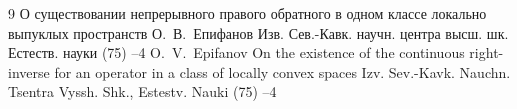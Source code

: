 \begin{thebibliography}{9}
\paper О существовании непрерывного правого обратного в одном классе локально выпуклых пространств 
\by О.~В.~Епифанов
\jour Изв. Сев.-Кавк. научн. центра высш. шк. Естеств. науки
(75)
--4
\misctransl
\by O.~V.~Epifanov
\paper On the existence of the continuous right-inverse for an operator in a class of locally convex spaces
\jour Izv. Sev.-Kavk. Nauchn. Tsentra Vyssh. Shk., Estestv. Nauki 
(75)
--4 

\end{thebibliography}

\noindent
\hskip6.5cm \thedate \par\noindent
\hskip6.5cm\therevdate
%

%
%



\makeengtitlem



 \newpage
%
%
%
